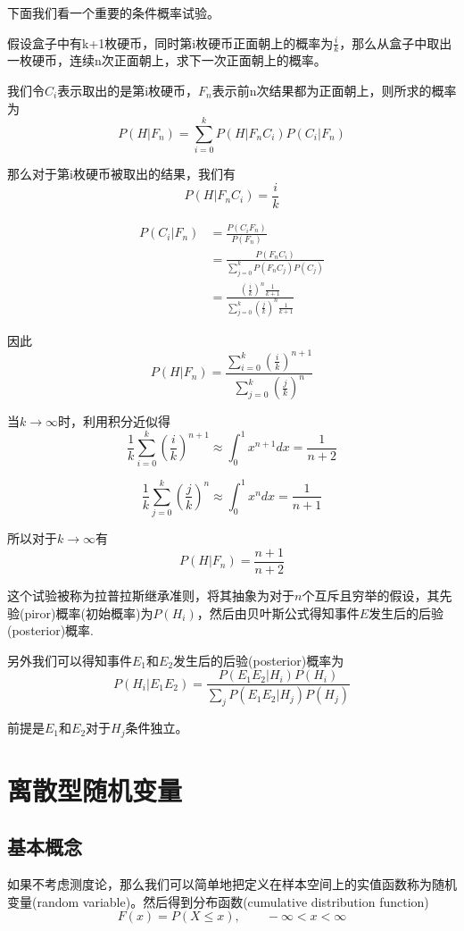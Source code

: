\documentclass[UTF8]{ctexart}
\begin{document}
下面我们看一个重要的条件概率试验。

假设盒子中有k+1枚硬币，同时第i枚硬币正面朝上的概率为$\frac{i}{k}$，那么从盒子中取出一枚硬币，连续n次正面朝上，求下一次正面朝上的概率。

我们令$C_{i}$表示取出的是第i枚硬币，$F_{n}$表示前n次结果都为正面朝上，则所求的概率为
$$P(H|F_{n})=\sum_{i=0}^{k}P(H|F_{n}C_{i})P(C_{i}|F_{n})$$

那么对于第i枚硬币被取出的结果，我们有
$$P(H|F_{n}C_{i})=\frac{i}{k}$$

$$\begin{aligned}
P(C_{i}|F_{n})&=\frac{P(C_{i}F_{n})}{P(F_{n})}\\
&=\frac{P(F_{n}C_{i})}{\sum\limits_{j=0}^{k}P(F_{n}C_{j})P(C_{j})}\\
&=\frac{(\frac{i}{k})^{n}\frac{1}{k+1}}{\sum\limits_{j=0}^{k}(\frac{j}{k})^{n}\frac{1}{k+1}}
\end{aligned}$$

因此
$$P(H|F_{n})=\frac{\sum\limits_{i=0}^{k}(\frac{i}{k})^{n+1}}{\sum\limits_{j=0}^{k}(\frac{j}{k})^{n}}$$

当$k\to \infty$时，利用积分近似得
$$\frac{1}{k}\sum\limits_{i=0}^{k}(\frac{i}{k})^{n+1}\approx \int_{0}^{1}x^{n+1}dx=\frac{1}{n+2}$$

$$\frac{1}{k}\sum\limits_{j=0}^{k}(\frac{j}{k})^{n}\approx \int_{0}^{1}x^{n}dx=\frac{1}{n+1}$$

所以对于$k\to \infty$有
$$P(H|F_{n})=\frac{n+1}{n+2}$$

这个试验被称为拉普拉斯继承准则，将其抽象为对于$n$个互斥且穷举的假设，其先验(piror)概率(初始概率)为$P(H_{i})$，然后由贝叶斯公式得知事件$E$发生后的后验(posterior)概率.

另外我们可以得知事件$E_{1}$和$E_{2}$发生后的后验(posterior)概率为
$$P(H_{i}|E_{1}E_{2})=\frac{P(E_{1}E_{2}|H_{i})P(H_{i})}{\sum\limits_{j}P(E_{1}E_{2}|H_{j})P(H_{j})}$$

前提是$E_{1}$和$E_{2}$对于$H_{j}$条件独立。

\section{离散型随机变量}

\subsection{基本概念}

如果不考虑测度论，那么我们可以简单地把定义在样本空间上的实值函数称为随机变量(random variable)。然后得到分布函数(cumulative distribution function)
$$F(x)=P(X\leq x),\qquad -\infty <x<\infty $$
\end{document}
